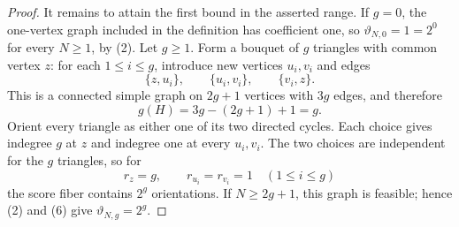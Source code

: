 \documentclass{article}
\begin{document}
\begin{proof}
It remains to attain the first bound in the asserted range.  If \(g=0\), the one-vertex graph included in the definition has coefficient one, so \(\vartheta_{N,0}=1=2^0\) for every \(N\geq1\), by (2).  Let \(g\geq1\).  Form a bouquet of \(g\) triangles with common vertex \(z\): for each \(1\leq i\leq g\), introduce new vertices \(u_i,v_i\) and edges
\[
 \{z,u_i\},\qquad \{u_i,v_i\},\qquad \{v_i,z\}.
\tag{4}
\]
This is a connected simple graph on \(2g+1\) vertices with \(3g\) edges, and therefore
\[
 g(H)=3g-(2g+1)+1=g.
\tag{5}
\]
Orient every triangle as either one of its two directed cycles.  Each choice gives indegree \(g\) at \(z\) and indegree one at every \(u_i,v_i\).  The two choices are independent for the \(g\) triangles, so for
\[
 r_z=g,\qquad r_{u_i}=r_{v_i}=1\quad(1\leq i\leq g)
\tag{6}
\]
the score fiber contains \(2^g\) orientations.  If \(N\geq2g+1\), this graph is feasible; hence (2) and (6) give \(\vartheta_{N,g}=2^g\).


\end{proof}
\end{document}
